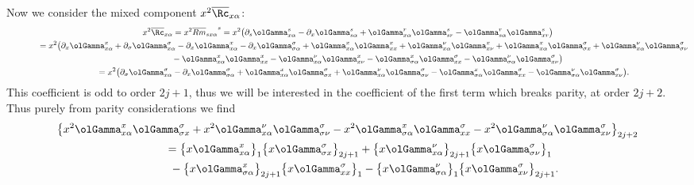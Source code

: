 Now we consider the mixed component $x^2 \overline{\Rc}_{x\alpha}$:
\begin{gather*}
x^2 \overline{\Rc}_{x \alpha} = x^2 {\overline{Rm}_{s x \alpha}}^{s}
= x^2 \big( \partial_s \olGamma_{x \alpha}^s - \partial_{x} \olGamma_{s \alpha}^s + \olGamma_{x \alpha}^r \olGamma_{sr}^s - \olGamma_{s \alpha}^r \olGamma_{x r}^s \big) \\
\hphantom{x^2 \overline{\Rc}_{x \alpha}}{}= x^2 \big( \partial_x \olGamma_{x \alpha}^x + \partial_{\sigma} \olGamma_{x \alpha}^{\sigma} - \partial_{x} \olGamma_{x \alpha}^x - \partial_{x} \olGamma_{\sigma \alpha}^{\sigma}
 + \olGamma_{x \alpha}^x \olGamma_{xx}^x + \olGamma_{x \alpha}^{\nu} \olGamma_{x\nu}^x + \olGamma_{x \alpha}^x \olGamma_{\sigma x}^{\sigma} + \olGamma_{x \alpha}^{\nu} \olGamma_{\sigma \nu}^{\sigma} \\
\hphantom{x^2 \overline{\Rc}_{x \alpha}=}{} - \olGamma_{x \alpha}^x \olGamma_{x x}^x - \olGamma_{x \alpha}^{\nu} \olGamma_{x \nu}^x
- \olGamma_{\sigma \alpha}^x \olGamma_{x x}^{\sigma}- \olGamma_{\sigma \alpha}^{\nu} \olGamma_{x \nu}^{\sigma} \big) \\
\hphantom{x^2 \overline{\Rc}_{x \alpha}}{}= x^2 \big( \partial_{\sigma} \olGamma_{x \alpha}^{\sigma} - \partial_{x} \olGamma_{\sigma \alpha}^{\sigma}+ \olGamma_{x \alpha}^x \olGamma_{\sigma x}^{\sigma} + \olGamma_{x \alpha}^{\nu} \olGamma_{\sigma \nu}^{\sigma} - \olGamma_{\sigma \alpha}^x \olGamma_{x x}^{\sigma}- \olGamma_{\sigma \alpha}^{\nu} \olGamma_{x \nu}^{\sigma} \big).
\end{gather*}
This coefficient is odd to order $2j+1$, thus we will be interested in the coefficient of the first term which breaks parity, at order $2j+2$. Thus purely from parity considerations we find
\begin{gather}
\big\{ x^2\olGamma_{x \alpha}^x \olGamma_{\sigma x}^{\sigma} + x^2\olGamma_{x \alpha}^{\nu} \olGamma_{\sigma \nu}^{\sigma} - x^2 \olGamma_{\sigma \alpha}^x \olGamma_{x x}^{\sigma}- x^2\olGamma_{\sigma \alpha}^{\nu} \olGamma_{x \nu}^{\sigma} \big\}_{2j+2} \nonumber \\
\qquad{} = \big\{x\olGamma_{x \alpha}^x\big\}_1 \big\{ x\olGamma_{\sigma x}^{\sigma}\big\}_{2j+1}+ \big\{x\olGamma_{x \alpha}^{\nu}\big\}_{2j+1} \big\{ x\olGamma_{\sigma \nu}^{\sigma}\big\}_1 \nonumber \\
\qquad\quad {}- \big\{x \olGamma_{\sigma \alpha}^x\big\}_{2j+1} \big\{ x\olGamma_{x x}^{\sigma}\big\}_1 - \big\{x\olGamma_{\sigma \alpha}^{\nu}\big\}_1 \big\{ x\olGamma_{x \nu}^{\sigma}\big\}_{2j+1}.\label{eqn:mixed-ref-3}
\end{gather}
